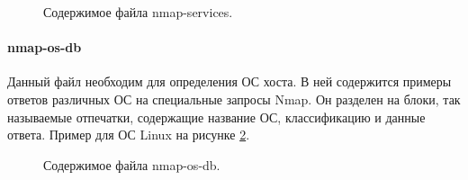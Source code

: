 \documentclass[10pt,a4paper]{report}
\begin{document}
\begin{figure}[h!]	
	\caption{Содержимое файла nmap-services.}
	\label{Img:4}
\end{figure}
\pagebreak

\paragraph{nmap-os-db\\}

Данный файл необходим для определения ОС хоста. В ней содержится примеры ответов различных ОС на специальные запросы Nmap. Он разделен на блоки, так называемые отпечатки, содержащие название ОС, классификацию и данные ответа.  Пример для ОС Linux на рисунке \ref{Img:5}.

\begin{figure}[h!]	
	\caption{Содержимое файла nmap-os-db.}
	\label{Img:5}
\end{figure}
\end{document}
